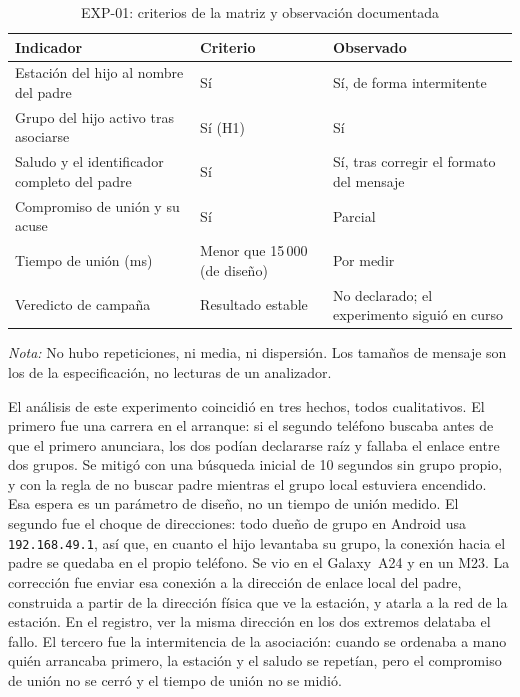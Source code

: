 \documentclass[12pt,oneside]{scrreprt}
\begin{document}
\begin{table}[H]
\centering
\singlespacing
\caption{EXP-01: criterios de la matriz y observación documentada}
\label{tab:exp01}
\renewcommand{\arraystretch}{1.15}
\begin{tabularx}{\textwidth}{@{} >{\raggedright\arraybackslash}p{4.6cm} >{\raggedright\arraybackslash}p{3.2cm} X @{}}
\toprule
\textbf{Indicador} & \textbf{Criterio} & \textbf{Observado} \\
\midrule
Estación del hijo al nombre del padre & Sí & Sí, de forma intermitente \\
Grupo del hijo activo tras asociarse & Sí (H1) & Sí \\
Saludo y el identificador completo del padre & Sí & Sí, tras corregir el formato del mensaje \\
Compromiso de unión y su acuse & Sí & Parcial \\
Tiempo de unión (ms) & Menor que 15\,000 (de diseño) & Por medir \\
Veredicto de campaña & Resultado estable & No declarado; el experimento siguió en curso \\
\bottomrule
\end{tabularx}
\par\vspace{0.2cm}
\small \raggedright \textit{Nota:} No hubo repeticiones, ni media, ni dispersión. Los tamaños de mensaje son los de la especificación, no lecturas de un analizador.
\end{table}

El análisis de este experimento coincidió en tres hechos, todos cualitativos. El primero fue una carrera en el arranque: si el segundo teléfono buscaba antes de que el primero anunciara, los dos podían declararse raíz y fallaba el enlace entre dos grupos. Se mitigó con una búsqueda inicial de 10 segundos sin grupo propio, y con la regla de no buscar padre mientras el grupo local estuviera encendido. Esa espera es un parámetro de diseño, no un tiempo de unión medido. El segundo fue el choque de direcciones: todo dueño de grupo en Android usa \texttt{192.168.49.1}, así que, en cuanto el hijo levantaba su grupo, la conexión hacia el padre se quedaba en el propio teléfono. Se vio en el Galaxy~A24 y en un M23. La corrección fue enviar esa conexión a la dirección de enlace local del padre, construida a partir de la dirección física que ve la estación, y atarla a la red de la estación. En el registro, ver la misma dirección en los dos extremos delataba el fallo. El tercero fue la intermitencia de la asociación: cuando se ordenaba a mano quién arrancaba primero, la estación y el saludo se repetían, pero el compromiso de unión no se cerró y el tiempo de unión no se midió.
\end{document}
